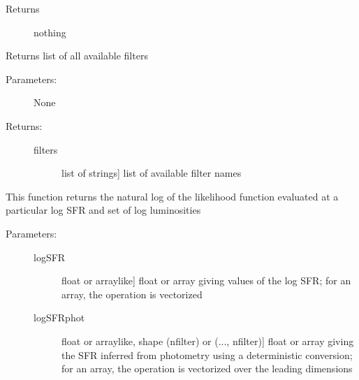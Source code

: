 \documentclass[letterpaper,10pt,english]{sphinxmanual}
\begin{document}
\begin{fulllineitems}
\begin{fulllineitems}
\begin{description}
\begin{description}
\end{description}

\item[{Returns}] \leavevmode
nothing

\end{description}

\end{fulllineitems}


\begin{fulllineitems}
\label{sfr_slug:slugpy.sfr_slug.sfr_slug.filters}
Returns list of all available filters
\begin{description}
\item[{Parameters:}] \leavevmode
None

\item[{Returns:}] \leavevmode\begin{description}
\item[{filters}] \leavevmode{[}list of strings{]}
list of available filter names

\end{description}

\end{description}

\end{fulllineitems}


\begin{fulllineitems}
\label{sfr_slug:slugpy.sfr_slug.sfr_slug.logL}
This function returns the natural log of the likelihood
function evaluated at a particular log SFR and set of log
luminosities
\begin{description}
\item[{Parameters:}] \leavevmode\begin{description}
\item[{logSFR}] \leavevmode{[}float or arraylike{]}
float or array giving values of the log SFR; for an
array, the operation is vectorized

\item[{logSFRphot}] \leavevmode{[}float or arraylike, shape (nfilter) or (..., nfilter){]}
float or array giving the SFR inferred from photometry using a
deterministic conversion; for an array, the operation is
vectorized over the leading dimensions


\end{description}
\end{description}
\end{fulllineitems}
\end{fulllineitems}
\end{document}

